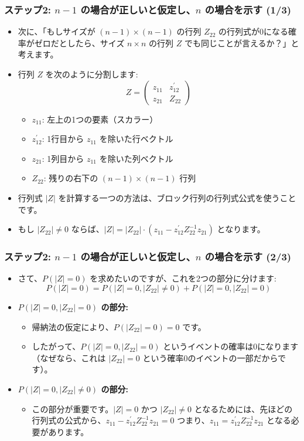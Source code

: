 \documentclass{beamer}
\begin{document}
\begin{frame}
\frametitle{ステップ2: $n-1$ の場合が正しいと仮定し、$n$ の場合を示す (1/3)}
\begin{itemize}
    \item 次に、「もしサイズが $(n-1)\times(n-1)$ の行列 $Z_{22}$ の行列式が0になる確率がゼロだとしたら、サイズ $n\times n$ の行列 $Z$ でも同じことが言えるか？」と考えます。
    \item 行列 $Z$ を次のように分割します:
    \[ Z=\begin{pmatrix}z_{11}&z_{12}^{\prime}\\ z_{21}&Z_{22}\end{pmatrix} \]
    \begin{itemize}
        \item $z_{11}$: 左上の1つの要素（スカラー）
        \item $z_{12}^{\prime}$: 1行目から $z_{11}$ を除いた行ベクトル
        \item $z_{21}$: 1列目から $z_{11}$ を除いた列ベクトル
        \item $Z_{22}$: 残りの右下の $(n-1)\times(n-1)$ 行列
    \end{itemize}
    \item 行列式 $|Z|$ を計算する一つの方法は、ブロック行列の行列式公式を使うことです。
    \item もし $|Z_{22}|\ne0$ ならば、$|Z|=|Z_{22}|\cdot(z_{11}-z_{12}^{\prime}Z_{22}^{-1}z_{21})$ となります。
\end{itemize}
\end{frame}

\begin{frame}
\frametitle{ステップ2: $n-1$ の場合が正しいと仮定し、$n$ の場合を示す (2/3)}
\begin{itemize}
    \item さて、$P(|Z|=0)$ を求めたいのですが、これを2つの部分に分けます:
    \[ P(|Z|=0)=P(|Z|=0,|Z_{22}|\ne0)+P(|Z|=0,|Z_{22}|=0) \]
    \item \textbf{$P(|Z|=0,|Z_{22}|=0)$ の部分:}
    \begin{itemize}
        \item 帰納法の仮定により、$P(|Z_{22}|=0)=0$ です。
        \item したがって、$P(|Z|=0,|Z_{22}|=0)$ というイベントの確率は0になります（なぜなら、これは $|Z_{22}|=0$ という確率0のイベントの一部だからです）。
    \end{itemize}
    \item \textbf{$P(|Z|=0,|Z_{22}|\ne0)$ の部分:}
    \begin{itemize}
        \item この部分が重要です。$|Z|=0$ かつ $|Z_{22}|\ne0$ となるためには、先ほどの行列式の公式から、$z_{11}-z_{12}^{\prime}Z_{22}^{-1}z_{21}=0$ つまり、$z_{11}=z_{12}^{\prime}Z_{22}^{-1}z_{21}$ となる必要があります。
    \end{itemize}
\end{itemize}
\end{frame}
\end{document}
